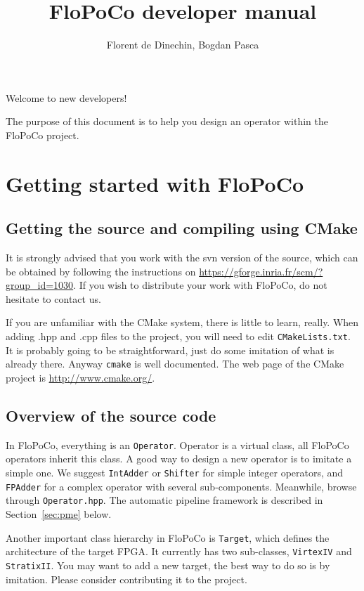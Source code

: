 \documentclass{article}
\title{FloPoCo developer manual}
\author{Florent de Dinechin, Bogdan Pasca}
\begin{document}
 
\sloppy



\maketitle


Welcome to new developers! 

The purpose of this document is to help you design an operator within the
FloPoCo project.

 \section{Getting started with FloPoCo}


\subsection{Getting the source and compiling using CMake}

It is strongly advised that you work with the svn version of the
source, which can be obtained by following the instructions on
\url{https://gforge.inria.fr/scm/?group_id=1030}. If you wish to
distribute your work with FloPoCo, do not hesitate to contact us.

If you are unfamiliar with the CMake system, there is little to learn,
really. When adding .hpp and .cpp files to the project, you will need
to edit \texttt{CMakeLists.txt}. It is probably going to be straightforward,
just do some imitation of what is already there. Anyway \texttt{cmake} is well
documented. The web page of the CMake project is \url{http://www.cmake.org/}.


\subsection{Overview of the source code}

In FloPoCo, everything is an \texttt{Operator}. Operator is a virtual
class, all FloPoCo operators inherit this class. A good way to design
a new operator is to imitate a simple one. We suggest
\texttt{IntAdder} or \texttt{Shifter} for simple integer operators,
and \texttt{FPAdder} for a complex operator with several
sub-components. Meanwhile, browse through \texttt{Operator.hpp}. The
automatic pipeline framework is described in Section~\ref{sec:pme} below.

Another important class hierarchy in FloPoCo is \texttt{Target}, which
defines the architecture of the target FPGA. It currently has two
sub-classes, \texttt{VirtexIV} and \texttt{StratixII}. You may want to
add a new target, the best way to do so is by imitation. Please
consider contributing it to the project.
\end{document}
